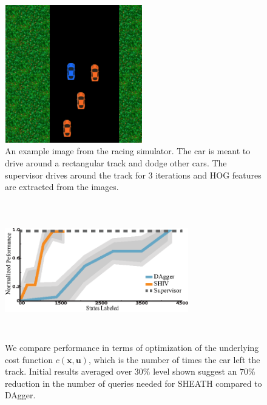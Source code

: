 \documentclass[10pt, conference]{ieeeconf}      %
\newcommand{\bu}{\mathbf{u}}
\newcommand{\bx}{\mathbf{x}}
\begin{document}
\begin{figure}[t!]
\centering
\includegraphics[width=6cm, height=6cm]{figures/race_car_track_example.png}
\caption{ An example image from the racing simulator. The car is meant to drive around a rectangular track and dodge other cars. The supervisor drives around the track for 3 iterations and HOG features are extracted from the images.}

\vspace*{-10pt}
\label{fig:race_car}
\end{figure}


\begin{figure}[t!]
\centering
\includegraphics[width=8cm, height=6cm]{figures/dagger_shiv_one_class.eps}
\caption{ We compare performance in terms of optimization of the underlying cost function $c(\bx,\bu)$, which is the number of times the car left the track. Initial results averaged over 30$\%$ level shown suggest an $70\%$ reduction in the number of queries needed for SHEATH compared to DAgger. }

\vspace*{-10pt}
\label{fig:car_cost}
\end{figure}
\end{document}
